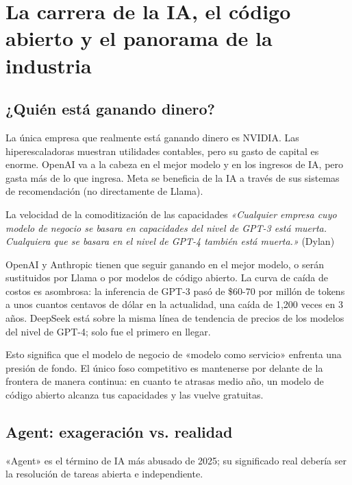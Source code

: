 \section{La carrera de la IA, el código abierto y el panorama de la industria}

\subsection{¿Quién está ganando dinero?}

La única empresa que realmente está ganando dinero es NVIDIA. Las hiperescaladoras muestran utilidades contables, pero su gasto de capital es enorme. OpenAI va a la cabeza en el mejor modelo y en los ingresos de IA, pero gasta más de lo que ingresa. Meta se beneficia de la IA a través de sus sistemas de recomendación (no directamente de Llama).

\begin{warningbox}{La velocidad de la comoditización de las capacidades}
\textit{«Cualquier empresa cuyo modelo de negocio se basara en capacidades del nivel de GPT-3 está muerta. Cualquiera que se basara en el nivel de GPT-4 también está muerta.»} (Dylan)

OpenAI y Anthropic tienen que seguir ganando en el mejor modelo, o serán sustituidos por Llama o por modelos de código abierto. La curva de caída de costos es asombrosa: la inferencia de GPT-3 pasó de \$60-70 por millón de tokens a unos cuantos centavos de dólar en la actualidad, una caída de 1,200 veces en 3 años. DeepSeek está sobre la misma línea de tendencia de precios de los modelos del nivel de GPT-4; solo fue el primero en llegar.

Esto significa que el modelo de negocio de «modelo como servicio» enfrenta una presión de fondo. El único foso competitivo es mantenerse por delante de la frontera de manera continua: en cuanto te atrasas medio año, un modelo de código abierto alcanza tus capacidades y las vuelve gratuitas.
\end{warningbox}

\subsection{Agent: exageración vs. realidad}

«Agent» es el término de IA más abusado de 2025; su significado real debería ser la resolución de tareas abierta e independiente.

